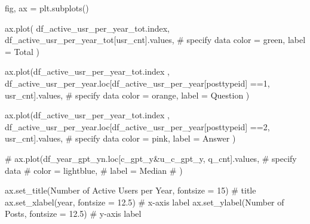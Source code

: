 \documentclass[
  letterpaper,
  DIV=11,
  numbers=noendperiod]{scrartcl}
\newenvironment{Shaded}{\begin{snugshade}}{\end{snugshade}}
\newcommand{\CommentTok}[1]{\textcolor[rgb]{0.37,0.37,0.37}{#1}}
\newcommand{\DecValTok}[1]{\textcolor[rgb]{0.68,0.00,0.00}{#1}}
\newcommand{\FloatTok}[1]{\textcolor[rgb]{0.68,0.00,0.00}{#1}}
\newcommand{\NormalTok}[1]{\textcolor[rgb]{0.00,0.23,0.31}{#1}}
\newcommand{\OperatorTok}[1]{\textcolor[rgb]{0.37,0.37,0.37}{#1}}
\newcommand{\StringTok}[1]{\textcolor[rgb]{0.13,0.47,0.30}{#1}}
\begin{document}
\begin{Shaded}
\begin{Highlighting}[]
\NormalTok{fig, ax }\OperatorTok{=}\NormalTok{ plt.subplots()}


\NormalTok{ax.plot( df\_active\_usr\_per\_year\_tot.index, }
\NormalTok{        df\_active\_usr\_per\_year\_tot[}\StringTok{\textquotesingle{}usr\_cnt\textquotesingle{}}\NormalTok{].values, }\CommentTok{\# specify data}
\NormalTok{        color }\OperatorTok{=} \StringTok{\textquotesingle{}green\textquotesingle{}}\NormalTok{,}
\NormalTok{        label }\OperatorTok{=} \StringTok{\textquotesingle{}Total\textquotesingle{}}
\NormalTok{) }


\NormalTok{ax.plot(df\_active\_usr\_per\_year\_tot.index}
\NormalTok{        , df\_active\_usr\_per\_year.loc[df\_active\_usr\_per\_year[}\StringTok{\textquotesingle{}posttypeid\textquotesingle{}}\NormalTok{] }\OperatorTok{==}\StringTok{\textquotesingle{}1\textquotesingle{}}\NormalTok{, }\StringTok{\textquotesingle{}usr\_cnt\textquotesingle{}}\NormalTok{].values, }\CommentTok{\# specify data}
\NormalTok{        color }\OperatorTok{=} \StringTok{\textquotesingle{}orange\textquotesingle{}}\NormalTok{,}
\NormalTok{        label }\OperatorTok{=} \StringTok{\textquotesingle{}Question\textquotesingle{}}
\NormalTok{) }

\NormalTok{ax.plot(df\_active\_usr\_per\_year\_tot.index}
\NormalTok{        , df\_active\_usr\_per\_year.loc[df\_active\_usr\_per\_year[}\StringTok{\textquotesingle{}posttypeid\textquotesingle{}}\NormalTok{] }\OperatorTok{==}\StringTok{\textquotesingle{}2\textquotesingle{}}\NormalTok{, }\StringTok{\textquotesingle{}usr\_cnt\textquotesingle{}}\NormalTok{].values, }\CommentTok{\# specify data}
\NormalTok{        color }\OperatorTok{=} \StringTok{\textquotesingle{}pink\textquotesingle{}}\NormalTok{,}
\NormalTok{        label }\OperatorTok{=} \StringTok{\textquotesingle{}Answer\textquotesingle{}}
\NormalTok{) }

\CommentTok{\# ax.plot(df\_year\_gpt\_yn.loc[c\_gpt\_y\&u\_c\_gpt\_y, \textquotesingle{}q\_cnt\textquotesingle{}].values, \# specify data}
\CommentTok{\#         color = \textquotesingle{}lightblue\textquotesingle{},}
\CommentTok{\#         label = \textquotesingle{}Median\textquotesingle{}}
\CommentTok{\# ) }




\NormalTok{ax.set\_title(}\StringTok{\textquotesingle{}Number of Active Users per Year\textquotesingle{}}\NormalTok{, fontsize }\OperatorTok{=} \DecValTok{15}\NormalTok{) }\CommentTok{\# title}
\NormalTok{ax.set\_xlabel(}\StringTok{\textquotesingle{}year\textquotesingle{}}\NormalTok{, fontsize }\OperatorTok{=} \FloatTok{12.5}\NormalTok{) }\CommentTok{\# x{-}axis label}
\NormalTok{ax.set\_ylabel(}\StringTok{\textquotesingle{}Number of Posts\textquotesingle{}}\NormalTok{, fontsize }\OperatorTok{=} \FloatTok{12.5}\NormalTok{) }\CommentTok{\# y{-}axis label}


\end{Highlighting}
\end{Shaded}
\end{document}
